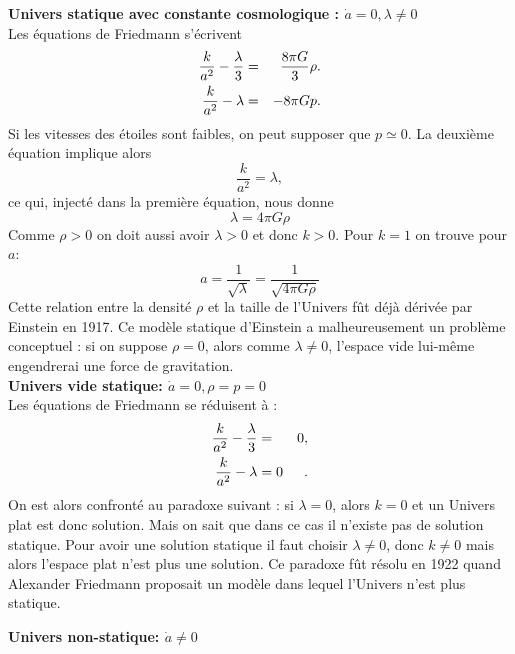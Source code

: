 \documentclass[a4paper,12pt]{report}
\theoremstyle{plain}
\theoremstyle{plain}
\begin{document}
 \textbf{Univers statique avec constante cosmologique : $\dot{a}=0 , \lambda \neq 0$} \\
 Les \'equations de Friedmann s'\'ecrivent 
 \begin{eqnarray}
  \frac{k}{a^2}- \frac{\lambda}{3} & = &\frac{8\pi G}{3} \rho . \cr
  \frac{k}{a^2} -\lambda &=& -8 \pi Gp. \nonumber
 \end{eqnarray}
  Si les vitesses des \'etoiles sont faibles, on peut supposer que $p\simeq 0$. La deuxi\`eme \'equation implique alors 
  \begin{equation}
  \frac{k}{a^2}= \lambda ,
  \end{equation} 
  ce qui, inject\'e dans la premi\`ere \'equation, nous donne 
  \begin{equation}
  \lambda = 4 \pi G \rho 
  \end{equation}
   Comme $\rho >0$ on doit aussi avoir $\lambda >0$ et donc $k>0$. Pour $k=1$ on trouve pour $a$: 
   \begin{equation}
   a=\frac{1}{\sqrt{\lambda}} = \frac{1}{\sqrt{4\pi G \rho}}
   \end{equation} 
  Cette relation entre la densit\'e $\rho $ et la taille de l'Univers f\^ut d\'ej\`a d\'eriv\'ee par Einstein en 1917. Ce mod\`ele statique d'Einstein a malheureusement un probl\`eme conceptuel : si on suppose $\rho =0$, alors comme $\lambda \neq 0$, l'espace vide lui-m\^eme engendrerai une force de gravitation.\\
  \textbf{Univers vide statique: $\dot{a}=0 , \rho = p=0$} \\
  Les \'equations de Friedmann se r\'eduisent \`a : 
  \begin{eqnarray}
  \frac{k}{a^2} - \frac{\lambda}{3}& =&0 , \cr
  \frac{k}{a^2} - \lambda &=0&. 
  \end{eqnarray}
  On est alors confront\'e  au paradoxe suivant : si $\lambda =0$, alors $k=0$ et un Univers plat est donc solution. Mais on sait que dans ce cas il n'existe pas de solution statique. Pour avoir une solution statique il faut choisir $\lambda \neq 0$, donc $k \neq 0$ mais alors l'espace plat n'est plus une solution. Ce paradoxe f\^ut r\'esolu en 1922 quand Alexander Friedmann proposait un mod\`ele dans lequel l'Univers n'est plus statique.
  
  \textbf{Univers non-statique: $ \dot{a} \neq 0$} 
  
\end{document}
